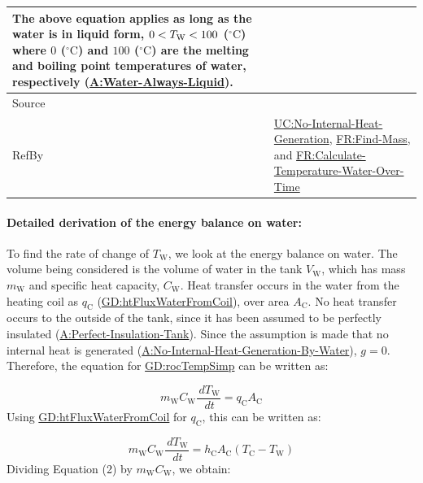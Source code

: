 \documentclass[12pt]{article}
\newcommand{\lt}{\ensuremath <}
\begin{document}
\begin{minipage}{\textwidth}
\begin{tabular}{>{\raggedright}p{}>{\raggedright\arraybackslash}p{}}
        The above equation applies as long as the water is in liquid form, $0\lt{}{T_{\text{W}}}\lt{}100$ (${{}^{\circ}\text{C}}$) where $0$ (${{}^{\circ}\text{C}}$) and $100$ (${{}^{\circ}\text{C}}$) are the melting and boiling point temperatures of water, respectively (\hyperref[assumpWAL]{A:Water-Always-Liquid}).
        
\\ \midrule
Source & \cite[(with PCM removed)]{koothoor2013}
         
\\ \midrule
RefBy & \hyperref[unlikeChgNIHG]{UC:No-Internal-Heat-Generation}, \hyperref[findMass]{FR:Find-Mass}, and \hyperref[calcTempWtrOverTime]{FR:Calculate-Temperature-Water-Over-Time}
        
\\ \bottomrule
\end{tabular}
\end{minipage}
\paragraph{Detailed derivation of the energy balance on water:}
\label{IM:eBalanceOnWtrDeriv}
To find the rate of change of ${T_{\text{W}}}$, we look at the energy balance on water. The volume being considered is the volume of water in the tank ${V_{\text{W}}}$, which has mass ${m_{\text{W}}}$ and specific heat capacity, ${C_{\text{W}}}$. Heat transfer occurs in the water from the heating coil as ${q_{\text{C}}}$ (\hyperref[GD:htFluxWaterFromCoil]{GD:htFluxWaterFromCoil}), over area ${A_{\text{C}}}$. No heat transfer occurs to the outside of the tank, since it has been assumed to be perfectly insulated (\hyperref[assumpPIT]{A:Perfect-Insulation-Tank}). Since the assumption is made that no internal heat is generated (\hyperref[assumpNIHGBW]{A:No-Internal-Heat-Generation-By-Water}), $g=0$. Therefore, the equation for \hyperref[GD:rocTempSimp]{GD:rocTempSimp} can be written as:

\begin{displaymath}
{m_{\text{W}}} {C_{\text{W}}} \frac{\,d{T_{\text{W}}}}{\,dt}={q_{\text{C}}} {A_{\text{C}}}
\end{displaymath}
Using \hyperref[GD:htFluxWaterFromCoil]{GD:htFluxWaterFromCoil} for ${q_{\text{C}}}$, this can be written as:

\begin{displaymath}
{m_{\text{W}}} {C_{\text{W}}} \frac{\,d{T_{\text{W}}}}{\,dt}={h_{\text{C}}} {A_{\text{C}}} \left({T_{\text{C}}}-{T_{\text{W}}}\right)
\end{displaymath}
Dividing Equation (2) by ${m_{\text{W}}} {C_{\text{W}}}$, we obtain:
\end{document}
